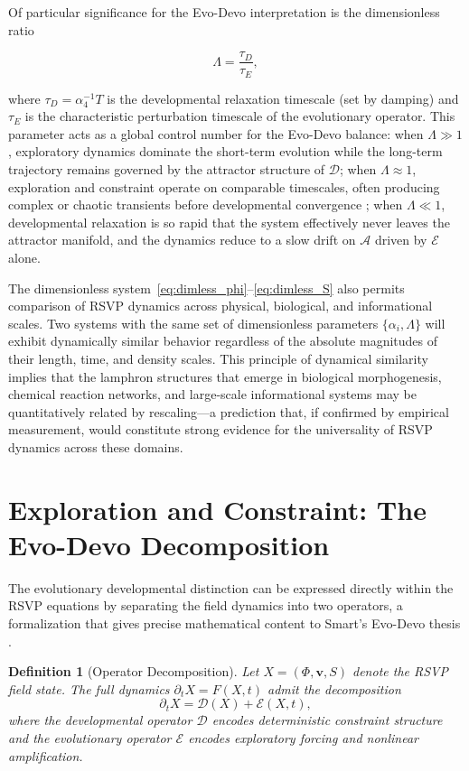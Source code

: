 \documentclass[12pt]{article}
\newtheorem{definition}{Definition}[section]
\begin{document}
Of particular significance for the Evo-Devo interpretation is the dimensionless ratio

\begin{equation}
\Lambda = \frac{\tau_D}{\tau_E},
\label{eq:Lambda}
\end{equation}

where $\tau_D = \alpha_4^{-1} T$ is the developmental relaxation timescale (set by damping) and $\tau_E$ is the characteristic perturbation timescale of the evolutionary operator. This parameter acts as a global control number for the Evo-Devo balance: when $\Lambda \gg 1$, exploratory dynamics dominate the short-term evolution while the long-term trajectory remains governed by the attractor structure of $\mathcal{D}$; when $\Lambda \approx 1$, exploration and constraint operate on comparable timescales, often producing complex or chaotic transients before developmental convergence \cite{langton1990,strogatz1994}; when $\Lambda \ll 1$, developmental relaxation is so rapid that the system effectively never leaves the attractor manifold, and the dynamics reduce to a slow drift on $\mathcal{A}$ driven by $\mathcal{E}$ alone.

The dimensionless system~\eqref{eq:dimless_phi}--\eqref{eq:dimless_S} also permits comparison of RSVP dynamics across physical, biological, and informational scales. Two systems with the same set of dimensionless parameters $\{\alpha_i, \Lambda\}$ will exhibit dynamically similar behavior regardless of the absolute magnitudes of their length, time, and density scales. This principle of dynamical similarity \cite{goldenfeld1992} implies that the lamphron structures that emerge in biological morphogenesis, chemical reaction networks, and large-scale informational systems may be quantitatively related by rescaling---a prediction that, if confirmed by empirical measurement, would constitute strong evidence for the universality of RSVP dynamics across these domains.

\section{Exploration and Constraint: The Evo-Devo Decomposition}
\label{sec:operators}

The evolutionary developmental distinction can be expressed directly within the RSVP equations by separating the field dynamics into two operators, a formalization that gives precise mathematical content to Smart's Evo-Devo thesis \cite{smart2009}.

\begin{definition}[Operator Decomposition]
Let $X = (\Phi, \mathbf{v}, S)$ denote the RSVP field state. The full dynamics $\partial_t X = F(X, t)$ admit the decomposition
\begin{equation}
\partial_t X = \mathcal{D}(X) + \mathcal{E}(X, t),
\label{eq:decomp}
\end{equation}
where the \emph{developmental operator} $\mathcal{D}$ encodes deterministic constraint structure and the \emph{evolutionary operator} $\mathcal{E}$ encodes exploratory forcing and nonlinear amplification.
\end{definition}
\end{document}
